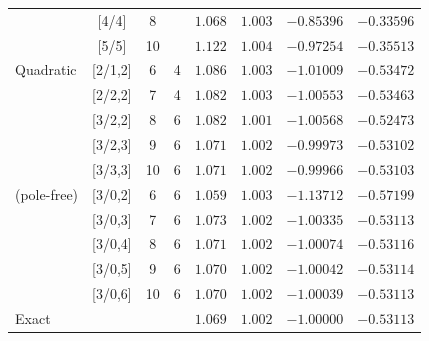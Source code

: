 \documentclass[aps,prb,reprint,noshowkeys,superscriptaddress]{revtex4-1}
\begin{document}
\begin{table}[b]
\begin{ruledtabular}
\begin{tabular}{lccccccc}
						&	[4/4]	&	8		&					&	$1.068$		&	$1.003$		&	$-0.85396$	&	$-0.33596$	\\
                        &	[5/5]	&	10		&					&	$1.122$		&	$1.004$		&	$-0.97254$	&	$-0.35513$	\\
            \hline
			Quadratic	&	[2/1,2]	&	6		&	4				&	$1.086$		&	$1.003$		&	$-1.01009$	&	$-0.53472$	\\
						&	[2/2,2]	&	7		&	4				&	$1.082$		&	$1.003$		&	$-1.00553$	&	$-0.53463$	\\
						&	[3/2,2]	&	8		&	6				&	$1.082$		&	$1.001$		&	$-1.00568$	&	$-0.52473$	\\
						&	[3/2,3]	&	9		&	6				&	$1.071$		&	$1.002$		&	$-0.99973$	&	$-0.53102$	\\
                        &	[3/3,3]	&	10		&	6				&	$1.071$		&	$1.002$		&	$-0.99966$	&	$-0.53103$	\\[0.5ex]
            (pole-free)	&	[3/0,2]	&	6		&	6				&	$1.059$	    &	$1.003$ 	&	$-1.13712$	&	$-0.57199$	\\
		                &	[3/0,3]	&	7		&	6				&	$1.073$		&	$1.002$		&	$-1.00335$	&	$-0.53113$	\\
						&	[3/0,4]	&	8		&	6				&	$1.071$		&	$1.002$		&	$-1.00074$	&	$-0.53116$	\\
						&	[3/0,5]	&	9		&	6				&	$1.070$		&	$1.002$		&	$-1.00042$	&	$-0.53114$	\\
						&	[3/0,6]	&	10		&	6				&	$1.070$		&	$1.002$		&	$-1.00039$	&	$-0.53113$	\\
			\hline
			Exact		&			&			&					&	$1.069$		&	$1.002$		&	$-1.00000$	&	$-0.53113$	\\
		\end{tabular}
	\end{ruledtabular}
\end{table}
\end{document}

